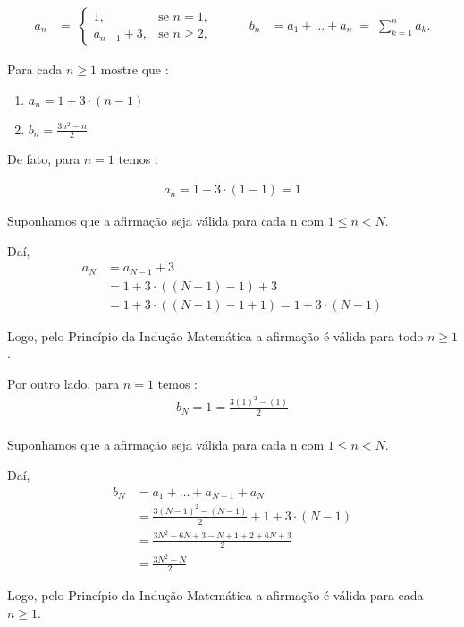 \begin{exemplo}[]
    \begin{equation*}
        \begin{alignedat}{2}
            a_n &=\; \begin{cases}
                1, & \text{se } n = 1,\\
                a_{n-1}+3, & \text{se } n \ge 2,
            \end{cases}
            &\qquad
            b_n &= a_1 + \dotsc + a_n \;=\; \sum_{k=1}^{n} a_k.
        \end{alignedat}
\end{equation*}

    Para cada $n \ge 1$ mostre que :
    \begin{enumerate}[label=\roman*.]
        \item $a_{n} = 1 + 3 \cdot (n-1)$
        \item $b_{n} = \frac{3n^{2} - n}{2}$
    \end{enumerate}
    
\end{exemplo}

De fato, para $n = 1$ temos :

\begin{align*}
a_n = 1 + 3 \cdot (1 - 1) = 1
\end{align*}

Suponhamos que a afirmação seja válida para cada n com $1 \leq n < N$.

Daí,
\begin{align*}
a_{N} &= a_{N-1} + 3 \\
&= 1 + 3 \cdot ((N-1) - 1) + 3 \\
&= 1 + 3 \cdot ((N-1) - 1 + 1) = 1 + 3 \cdot (N - 1) 
\end{align*}

Logo, pelo Princípio da Indução Matemática a afirmação é válida para todo $n \ge 1$.

Por outro lado, para $n = 1$ temos : 
\begin{align*}
b_{N} = 1 = \frac{3(1)^2 - (1)}{2} \\
\end{align*}

Suponhamos que a afirmação seja válida para cada n com $1 \leq n < N$.

Daí,
\begin{align*}
b_{N} &= a_1 + \dotsc + a_{N-1} + a_{N} \\
&= \frac{3(N-1)^2 - (N-1)}{2} + 1 + 3 \cdot (N - 1) \\
&= \frac{ 3N^{2} -6N + 3 -N + 1 + 2 + 6N + 3 }{2} \\
&= \frac{3N^{2} - N}{2}
\end{align*}

Logo, pelo Princípio da Indução Matemática a afirmação é válida para cada $n \ge 1$.
